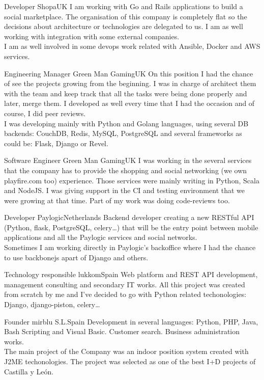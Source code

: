 \documentclass[11pt, a4paper, sans]{moderncv}
\begin{document}
\makecvtitle


%
%

{Developer}
{Shopa}{UK}{}
{I am working with Go and Rails applications to build a social marketplace. The
organisation of this company is completely flat so the decisions about
architecture or technologies are delegated to us. I am as well working with
integration with some external companies.\\I am as well  involved in some
devops work related with Ansible, Docker and AWS services.}

{Engineering Manager}
{Green Man Gaming}{UK}{}
{On this position I had the chance of see the projects growing from the
beginning. I was in charge of architect them with the team and keep track that
all the tasks were being done properly and later, merge them. I developed  as
well every time that I had the occasion and of course, I did peer reviews.\\I
was developing mainly with Python and Golang languages, using several DB
backends: CouchDB, Redis, MySQL, PostgreSQL and several frameworks as could be:
Flask, Django or Revel.}

{Software Engineer}
{Green Man Gaming}{UK}{}
{I was working in the several services that the company has to provide the
shopping and social networking (we own playfire.com too) experience. Those
services were mainly writing in Python, Scala and NodeJS. I was giving support
in the CI and testing environment that we were growing at that time. Part of my
work was doing code-reviews too.}

{Developer}
{Paylogic}{Netherlands}{}
{Backend developer creating a new RESTful API (Python, flask, PostgreSQL,
celery\ldots) that will be the entry point between mobile applications and all
the Paylogic services and social networks.\\Sometimes I am working directly in
Paylogic's backoffice where I had the chance to use backbonejs apart of Django
and others.}

{Technology responsible}
{lukkom}{Spain}{}
{Web platform and REST API development, management consulting and secondary IT
works. All this project was created from scratch by me and I've decided to go
with Python related techonologies: Django, django-piston, celery\ldots}

{Founder}
{mirblu S.L.}{Spain}{}
{Development in several languages: Python, PHP, Java, Bash Scripting and Visual
Basic. Customer search. Business administration works.\\The main project of the
Company was an indoor position system created with J2ME techonologies. The
project was selected as one of the best I+D projects of Castilla y León.}
\end{document}
